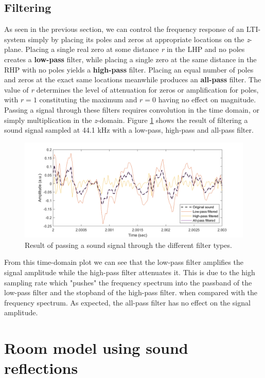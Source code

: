 \documentclass[journal]{IEEEtran}
\begin{document}
\subsection{Filtering} 
As seen in the previous section, we can control the frequency response of an LTI-system simply by placing its poles and zeros at appropriate locations on the \textit{z}-plane. Placing a single real zero at some distance \textit{r} in the LHP and no poles creates a \textbf{low-pass} filter, while placing a single zero at the same distance in the RHP with no poles yields a \textbf{high-pass} filter. Placing an equal number of poles and zeros at the exact same locations meanwhile produces an \textbf{all-pass} filter. The value of \textit{r} determines the level of attenuation for zeros or amplification for poles, with $r=1$ constituting the maximum and $r=0$ having no effect on magnitude.\\
Passing a signal through these filters requires convolution in the time domain, or simply multiplication in the \textit{z}-domain. Figure \ref{fig:filtered_sound} shows the result of filtering a sound signal sampled at 44.1 kHz with a low-pass, high-pass and all-pass filter. 
\begin{figure}[H]
    \centering
    \includegraphics[width=\columnwidth]{assignment_01/plots/filtered_sound.png}
    \caption{Result of passing a sound signal through the different filter types.}
    \label{fig:filtered_sound}
\end{figure}
From this time-domain plot we can see that the low-pass filter amplifies the signal amplitude while the high-pass filter attenuates it. This is due to the high sampling rate which "pushes" the frequency spectrum into the passband of the low-pass filter and the stopband of the high-pass filter. when compared with the frequency spectrum. As expected, the all-pass filter has no effect on the signal amplitude. 
\clearpage

\section{Room model using sound reflections}
\end{document}
